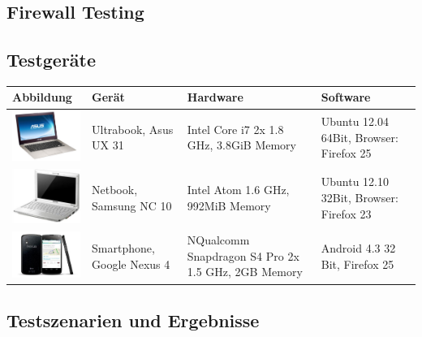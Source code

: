 \begin{landscape}

\chapter{Firewall Testing}
	\label{firewalltesting}

	
	\section{Testgeräte}
	\begin{tabularx}{1.4\textwidth}{|l|XXX|}
		\hline
		\textbf{Abbildung} & \textbf{Gerät} & \textbf{Hardware} & \textbf{Software}\\
		\hline
		\includegraphics[width=3cm]{../performanceAnalaysis/devices/asusux21.png} & Ultrabook, Asus UX 31 & Intel Core i7 2x 1.8 GHz, 3.8GiB Memory
& Ubuntu 12.04 64Bit, Browser: Firefox 25 \\
		\hline
		\includegraphics[width=3cm]{../performanceAnalaysis/devices/samsungnc10.jpg} & Netbook, Samsung NC 10 & Intel Atom 1.6 GHz, 992MiB Memory & Ubuntu 12.10 32Bit, Browser: Firefox 23 \\
		\hline
		\includegraphics[width=3cm]{../performanceAnalaysis/devices/googlenexus4.jpg} & Smartphone, Google Nexus 4 & NQualcomm Snapdragon S4 Pro 2x 1.5 GHz, 2GB Memory & Android 4.3 32 Bit, Firefox 25 \\
		\hline
	\end{tabularx}
	
	
	\section{Testszenarien und Ergebnisse}
	

\end{landscape}
